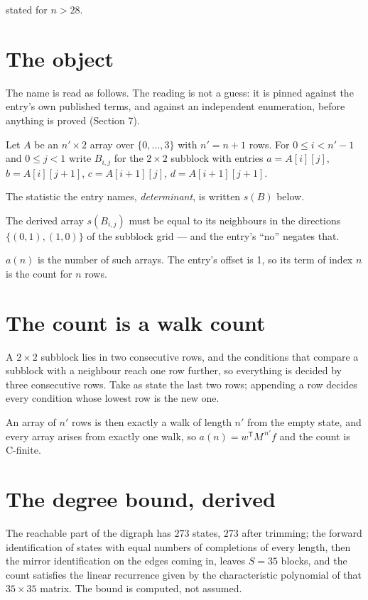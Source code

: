 \documentclass[11pt]{article}
\theoremstyle{definition}
\begin{document}
stated for $n > 28$.

\section{The object}

The name is read as follows. The reading is not a guess: it is pinned against the entry's own published terms, and against an independent enumeration, before anything is proved (Section 7).

Let $A$ be an $n' \times 2$ array over $\{0,\dots,3\}$ with $n' = n + 1$ rows. For $0 \le i < n'-1$ and $0 \le j < 1$ write $B_{i,j}$ for the $2\times2$ subblock with entries $a = A[i][j]$, $b = A[i][j{+}1]$, $c = A[i{+}1][j]$, $d = A[i{+}1][j{+}1]$.

The statistic the entry names, {\itshape determinant}, is written $s(B)$ below.

The derived array $s(B_{i,j})$ must be equal to its neighbours in the directions $\{(0,1), (1,0)\}$ of the subblock grid --- and the entry's ``no'' negates that.

$a(n)$ is the number of such arrays. The entry's offset is 1, so its term of index $n$ is the count for $n$ rows.

\section{The count is a walk count}

A $2\times2$ subblock lies in two consecutive rows, and the conditions that compare a subblock with a neighbour reach one row further, so everything is decided by three consecutive rows. Take as state the last two rows; appending a row decides every condition whose lowest row is the new one.

An array of $n'$ rows is then exactly a walk of length $n'$ from the empty state, and every array arises from exactly one walk, so $a(n) = w^{\mathsf T}M^{\,n'}f$ and the count is C-finite.

\section{The degree bound, derived}

The reachable part of the digraph has $273$ states, $273$ after trimming; the forward identification of states with equal numbers of completions of every length, then the mirror identification on the edges coming in, leaves $S = 35$ blocks, and the count satisfies the linear recurrence given by the characteristic polynomial of that $35\times35$ matrix. The bound is computed, not assumed.
\end{document}
